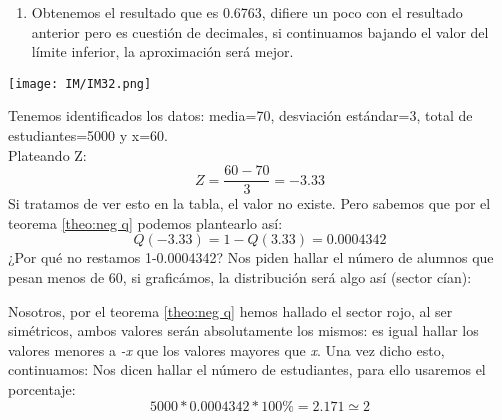 \documentclass[
	12pt, %
	fleqn, %
	a4paper, %
	oneside, %
]{LegrandOrangeBook}
\begin{document}
\begin{example}
\begin{enumerate}
\begin{center}
\texttt{[image: IM/IM30.png]}
\end{center}
\begin{center}
\texttt{[image: IM/IM31.png]}
\end{center}
\item Obtenemos el resultado que es 0.6763, difiere un poco con el resultado anterior pero es cuestión de decimales, si continuamos bajando el valor del límite inferior, la aproximación será mejor.
\end{enumerate}
\begin{center}
\texttt{[image: IM/IM32.png]}
\end{center}
\end{example}
\begin{example}
Tenemos identificados los datos: media=70, desviación estándar=3, total de estudiantes=5000 y x=60.\\
Plateando Z:
\begin{displaymath}
Z=\frac{60-70}{3}=-3.33
\end{displaymath}
Si tratamos de ver esto en la tabla, el valor no existe. Pero sabemos que por el teorema \ref{theo:neg q} podemos plantearlo así:
\begin{displaymath}
Q(-3.33)=1-Q(3.33)=0.0004342
\end{displaymath}
¿Por qué no restamos 1-0.0004342? Nos piden hallar el número de alumnos que pesan menos de 60, si graficámos, la distribución será algo así (sector cían):
\begin{center}
\end{center}
Nosotros, por el teorema \ref{theo:neg q} hemos hallado el sector rojo, al ser simétricos, ambos valores serán absolutamente los mismos: es igual hallar los valores menores a \textit{-x} que los valores mayores que \textit{x}. Una vez dicho esto, continuamos:
Nos dicen hallar el número de estudiantes, para ello usaremos el porcentaje:
\begin{displaymath}
5000*0.0004342*100\%=2.171\simeq 2
\end{displaymath}
\end{example}
\end{document}
